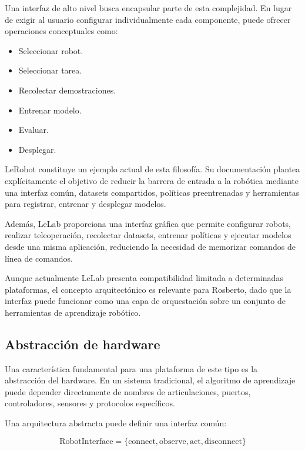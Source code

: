 \documentclass[stu,12pt,floatsintext]{apa7}
\begin{document}
Una interfaz de alto nivel busca encapsular parte de esta complejidad. En lugar de exigir al usuario configurar individualmente cada componente, puede ofrecer operaciones conceptuales como:

\begin{itemize}
    \item Seleccionar robot.
    \item Seleccionar tarea.
    \item Recolectar demostraciones.
    \item Entrenar modelo.
    \item Evaluar.
    \item Desplegar.
\end{itemize}

LeRobot constituye un ejemplo actual de esta filosofía. Su documentación plantea explícitamente el objetivo de reducir la barrera de entrada a la robótica mediante una interfaz común, datasets compartidos, políticas preentrenadas y herramientas para registrar, entrenar y desplegar modelos.

Además, LeLab proporciona una interfaz gráfica que permite configurar robots, realizar teleoperación, recolectar datasets, entrenar políticas y ejecutar modelos desde una misma aplicación, reduciendo la necesidad de memorizar comandos de línea de comandos.

Aunque actualmente LeLab presenta compatibilidad limitada a determinadas plataformas, el concepto arquitectónico es relevante para Rosberto, dado que la interfaz puede funcionar como una capa de orquestación sobre un conjunto de herramientas de aprendizaje robótico.

\subsection{Abstracción de hardware}

Una característica fundamental para una plataforma de este tipo es la abstracción del hardware. En un sistema tradicional, el algoritmo de aprendizaje puede depender directamente de nombres de articulaciones, puertos, controladores, sensores y protocolos específicos.

Una arquitectura abstracta puede definir una interfaz común:

\begin{equation}
\mathrm{RobotInterface}
=
\{
\mathrm{connect},
\mathrm{observe},
\mathrm{act},
\mathrm{disconnect}
\}
\end{equation}
\end{document}

